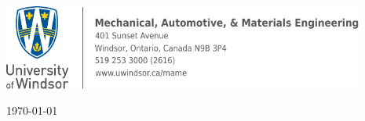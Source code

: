 \begin{titlingpage}
\vspace*{-0.35in}
\hspace{-1.05in}
\includegraphics[height=1.1in]{uwlogo}
\begin{center}
\vspace{1.5in}
\LARGE
\thetitle
\vspace{2in}
\large
\theauthor
\vspace{1in}
\today
\vfill
\end{center}
\end{titlingpage}
